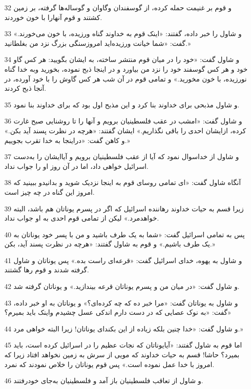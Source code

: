 \par 32 و قوم بر غنیمت حمله کرده، از گوسفندان وگاوان و گوساله‌ها گرفته، بر زمین کشتند و قوم آنهارا با خون خوردند.
\par 33 و شاول را خبر داده، گفتند: «اینک قوم به خداوند گناه ورزیده، با خون می‌خورند.» گفت: «شما خیانت ورزیده‌اید امروزسنگی بزرگ نزد من بغلطانید.»
\par 34 و شاول گفت: «خود را در میان قوم منتشر ساخته، به ایشان بگویید: هر کس گاو خود و هر کس گوسفند خود را نزد من بیاورد و در اینجا ذبح نموده، بخورید وبه خدا گناه نورزیده، با خون مخورید.» و تمامی قوم در آن شب هر کس گاوش را با خود آورده، در آنجا ذبح کردند.
\par 35 و شاول مذبحی برای خداوند بنا کرد و این مذبح اول بود که برای خداوند بنا نمود.
\par 36 و شاول گفت: «امشب در عقب فلسطینیان برویم و آنها را تا روشنایی صبح غارت کرده، ازایشان احدی را باقی نگذاریم.» ایشان گفتند: «هرچه در نظرت پسند آید بکن.» و کاهن گفت: «دراینجا به خدا تقرب بجوییم.»
\par 37 و شاول از خداسوال نمود که آیا از عقب فلسطینیان برویم و آیاایشان را به‌دست اسرائیل خواهی داد، اما در آن روز او را جواب نداد.
\par 38 آنگاه شاول گفت: «ای تمامی روسای قوم به اینجا نزدیک شوید و بدانیدو ببینید که امروز این گناه در چه چیز است.
\par 39 زیرا قسم به حیات خداوند رهاننده اسرائیل که اگر در پسرم یوناتان هم باشد، البته خواهدمرد.» لیکن از تمامی قوم احدی به او جواب نداد.
\par 40 پس به تمامی اسرائیل گفت: «شما به یک طرف باشید و من با پسر خود یوناتان به یک طرف باشیم.» و قوم به شاول گفتند: «هر‌چه در نظرت پسند آید، بکن.»
\par 41 و شاول به یهوه، خدای اسرائیل گفت: «قرعه‌ای راست بده.» پس یوناتان و شاول گرفته شدند و قوم رها گشتند.
\par 42 و شاول گفت: «در میان من و پسرم یوناتان قرعه بیندازید.» و یوناتان گرفته شد.
\par 43 و شاول به یوناتان گفت: «مرا خبر ده که چه کرده‌ای؟» و یوناتان به او خبر داده، گفت: «به نوک عصایی که در دست دارم اندکی عسل چشیدم واینک باید بمیرم؟»
\par 44 و شاول گفت: «خدا چنین بلکه زیاده از این بکند‌ای یوناتان! زیرا البته خواهی مرد.»
\par 45 اما قوم به شاول گفتند: «آیایوناتان که نجات عظیم را در اسرائیل کرده است، باید بمیرد؟ حاشا! قسم به حیات خداوند که مویی از سرش به زمین نخواهد افتاد زیرا که امروز با خدا عمل نموده است.» پس قوم یوناتان را خلاص نمودند که نمرد.
\par 46 و شاول از تعاقب فلسطینیان باز آمد و فلسطینیان به‌جای خودرفتند.
